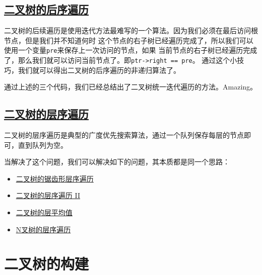 \documentclass[../../main.tex]{subfiles}
\begin{document}
\subsection{\href{https://leetcode.cn/problems/binary-tree-postorder-traversal/}
{二叉树的后序遍历}}

二叉树的后续遍历是使用迭代方法最难写的一个算法。因为我们必须在最后访问根节点，但是我们并不知道何时
这个节点的右子树已经遍历完成了，所以我们可以使用一个变量\texttt{pre}来保存上一次访问的节点，如果
当前节点的右子树已经遍历完成了，那么我们就可以访问当前节点了。即\texttt{ptr->right == pre}。
通过这个小技巧，我们就可以得出二叉树的后序遍历的非递归算法了。

\begin{kaobox}[title=二叉树统一迭代遍历方法]
  通过上述的三个代码，我们已经总结出了二叉树统一迭代遍历的方法。Amazing。
\end{kaobox}



\subsection{\href{https://leetcode-cn.com/problems/binary-tree-level-order-traversal/}
{二叉树的层序遍历}}

二叉树的层序遍历是典型的广度优先搜索算法，通过一个队列保存每层的节点即可，直到队列为空。



当解决了这个问题，我们可以解决如下的问题，其本质都是同一个思路：

\begin{itemize}
  \item \href{https://leetcode-cn.com/problems/binary-tree-zigzag-level-order-traversal/}
  {二叉树的锯齿形层序遍历}
  \item \href{https://leetcode.cn/problems/binary-tree-level-order-traversal-ii}
  {二叉树的层序遍历 II}
  \item \href{https://leetcode.cn/problems/average-of-levels-in-binary-tree}
  {二叉树的层平均值}
  \item \href{https://leetcode.cn/problems/n-ary-tree-level-order-traversal}
  {N叉树的层序遍历}
\end{itemize}

\section{二叉树的构建}
\end{document}

